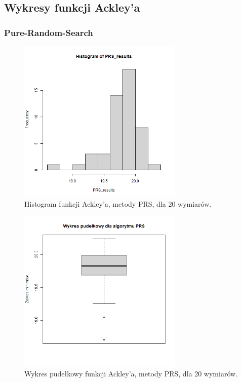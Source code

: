 \documentclass{lab}
\begin{document}
\subsection{Wykresy funkcji Ackley’a}
\subsubsection{Pure-Random-Search}
\begin{figure}[H]
  \centering
  \includegraphics[width=0.7\textwidth]{img/dim20_PRS_Ackley_his.png}
  \caption{Histogram funkcji Ackley'a, metody PRS, dla 20 wymiarów.}
\end{figure}
\begin{figure}[H]
  \centering
  \includegraphics[width=0.7\textwidth]{img/dim20_PRS_Ackley.png}
  \caption{Wykres pudełkowy funkcji Ackley'a, metody PRS, dla 20 wymiarów.}
\end{figure}
\end{document}
